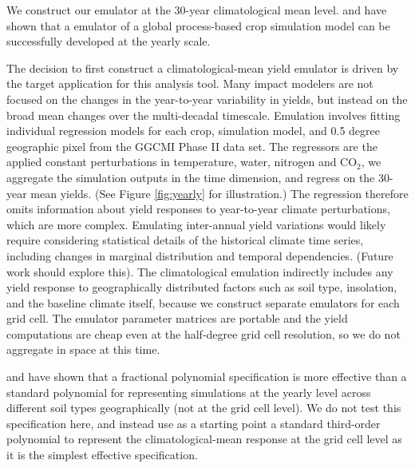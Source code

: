 \documentclass[preprint, 5p, times, twocolumn]{elsarticle}
\begin{document}
We construct our emulator at the 30-year climatological mean level. \citet{BLANC2015} and \citet{BLANC2017} have shown that a emulator of a global process-based crop simulation model can be successfully developed at the yearly scale. 

The decision to first construct a climatological-mean yield emulator is driven by the target application for this analysis tool. Many impact modelers are not focused on the changes in the year-to-year variability in yields, but instead on the broad mean changes over the multi-decadal timescale. Emulation involves fitting individual regression models for each crop, simulation model, and 0.5 degree geographic pixel from the GGCMI Phase II data set. The regressors are the applied constant perturbations in temperature, water, nitrogen and CO$_2$, we aggregate the simulation outputs in the time dimension, and regress on the 30-year mean yields. (See Figure \ref{fig:yearly} for illustration.) The regression therefore omits information about yield responses to year-to-year climate perturbations, which are more complex. Emulating inter-annual yield variations would likely require considering statistical details of the historical climate time series, including changes in marginal distribution and temporal dependencies. (Future work should explore this). The climatological emulation indirectly includes any yield response to geographically distributed factors such as soil type, insolation, and the baseline climate itself, because we construct separate emulators for each grid cell. The emulator parameter matrices are portable and the yield computations are cheap even at the half-degree grid cell resolution, so we do not aggregate in space at this time.

\citet{BLANC2015} and \citet{BLANC2017} have shown that a fractional polynomial specification is more effective than a standard polynomial for representing simulations at the yearly level across different soil types geographically (not at the grid cell level). We do not test this specification here, and instead use as a starting point a standard third-order polynomial to represent the climatological-mean response at the grid cell level as it is the simplest effective specification. 
\end{document}
